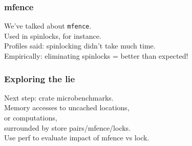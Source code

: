 \documentclass[aspectratio=43]{beamer}
\newenvironment{changemargin}[1]{%
  \begin{list}{}{%
    \setlength{\topsep}{0pt}%
    \setlength{\leftmargin}{#1}%
    \setlength{\rightmargin}{1em}
    \setlength{\listparindent}{\parindent}%
    \setlength{\itemindent}{\parindent}%
    \setlength{\parsep}{\parskip}%
  }%
  \item[]}{\end{list}}
\begin{document}
\begin{frame}
  \frametitle{mfence}

  \begin{changemargin}{1.5cm}
    We've talked about {\tt mfence}.\\
    Used in spinlocks, for instance.\\[2em]
    Profiles said: spinlocking didn't take much time.\\
    Empirically: eliminating spinlocks = better than expected!
    
  \end{changemargin}
  
\end{frame}

\begin{frame}
  \frametitle{Exploring the lie}

  \begin{changemargin}{2cm}
    Next step: crate microbenchmarks.\\[1em]
    Memory accesses to uncached locations,\\
    or computations,\\[1em]
    surrounded by store pairs/mfence/locks.\\[1em]
    Use perf to evaluate impact of mfence vs lock.
  \end{changemargin}

\end{frame}
\end{document}
